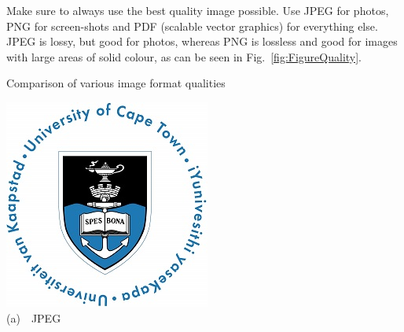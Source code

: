
Make sure to always use the best quality image possible.  Use JPEG for photos, PNG for screen-shots and PDF (scalable vector graphics) for everything else.  JPEG is lossy, but good for photos, whereas PNG is lossless and good for images with large areas of solid colour, as can be seen in Fig.~\ref{fig:FigureQuality}.

\begin{FigureEnvironment}{Comparison of various image format qualities}%
  \label{fig:FigureQuality}%
  \hfill
  \begin{minipage}[b]{0.3\textwidth}\centering\setlength{\parindent}{0mm}
    \includegraphics[width=\textwidth]{Figures/UCT.jpg}\\%
    {\small (a)~~JPEG}%
  \end{minipage}
  \hfill
  \begin{minipage}[b]{0.3\textwidth}\centering\setlength{\parindent}{0mm}

\end{minipage}
\end{FigureEnvironment}
